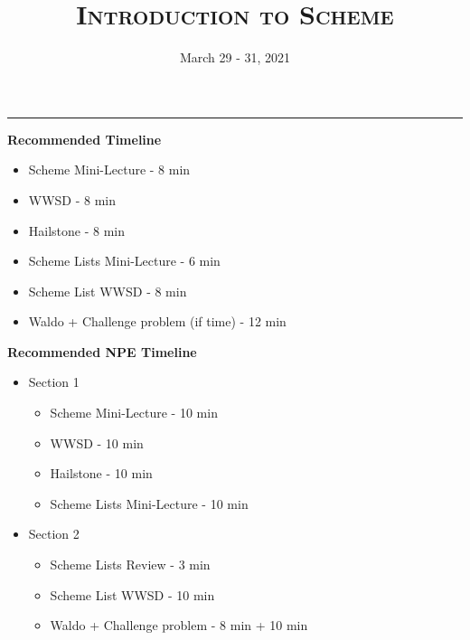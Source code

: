 \documentclass{exam}
\title{\textsc{Introduction to Scheme}}
\date{March 29 - 31, 2021}
\begin{document}
\maketitle
\rule{\textwidth}{0.15em}
\fontsize{12}{15}\selectfont

\begin{blocksection}
\begin{guide}
\textbf{Recommended Timeline}
\begin{itemize}
  \item Scheme Mini-Lecture - 8 min
  \item WWSD - 8 min
  \item Hailstone - 8 min
  \item Scheme Lists Mini-Lecture - 6 min
  \item Scheme List WWSD - 8 min
  \item Waldo + Challenge problem (if time) - 12 min
\end{itemize}
\end{guide}
\end{blocksection}

\begin{blocksection}
\begin{guide}
\textbf{Recommended NPE Timeline}
  \begin{itemize}
  \item Section 1
  \begin{itemize}
    \item Scheme Mini-Lecture - 10 min
    \item WWSD - 10 min
    \item Hailstone - 10 min
    \item Scheme Lists Mini-Lecture - 10 min
  \end{itemize}
  \item Section 2
  \begin{itemize}
    \item Scheme Lists Review - 3 min
    \item Scheme List WWSD - 10 min
    \item Waldo + Challenge problem - 8 min + 10 min
  \end{itemize}
\end{itemize}
\end{guide}
\end{blocksection}
\end{document}
